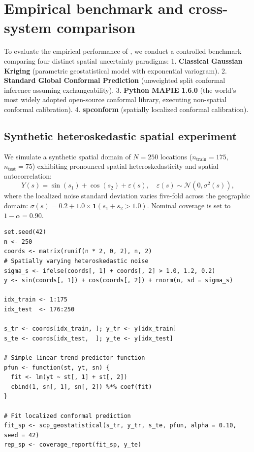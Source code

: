 \section{Empirical benchmark and cross-system comparison}\label{empirical-benchmark-and-cross-system-comparison}

To evaluate the empirical performance of , we conduct a controlled benchmark comparing four distinct spatial uncertainty paradigms:
1. \textbf{Classical Gaussian Kriging} (parametric geostatistical model with exponential variogram).
2. \textbf{Standard Global Conformal Prediction} (unweighted split conformal inference assuming exchangeability).
3. \textbf{Python MAPIE 1.6.0} (the world's most widely adopted open-source conformal library, executing non-spatial conformal calibration).
4. \textbf{spconform} (spatially localized conformal calibration).

\subsection{Synthetic heteroskedastic spatial experiment}\label{synthetic-heteroskedastic-spatial-experiment}

We simulate a synthetic spatial domain of \(N = 250\) locations (\(n_{\text{train}} = 175\), \(n_{\text{test}} = 75\)) exhibiting pronounced spatial heteroskedasticity and spatial autocorrelation:
\[
Y(s) = \sin(s_1) + \cos(s_2) + \varepsilon(s), \quad \varepsilon(s) \sim \mathcal{N}\left(0, \sigma^2(s)\right),
\]
where the localized noise standard deviation varies five-fold across the geographic domain: \(\sigma(s) = 0.2 + 1.0 \times \mathbf{1}(s_1 + s_2 > 1.0)\). Nominal coverage is set to \(1 - \alpha = 0.90\).

\begin{verbatim}
set.seed(42)
n <- 250
coords <- matrix(runif(n * 2, 0, 2), n, 2)
# Spatially varying heteroskedastic noise
sigma_s <- ifelse(coords[, 1] + coords[, 2] > 1.0, 1.2, 0.2)
y <- sin(coords[, 1]) + cos(coords[, 2]) + rnorm(n, sd = sigma_s)

idx_train <- 1:175
idx_test  <- 176:250

s_tr <- coords[idx_train, ]; y_tr <- y[idx_train]
s_te <- coords[idx_test,  ]; y_te <- y[idx_test]

# Simple linear trend predictor function
pfun <- function(st, yt, sn) {
  fit <- lm(yt ~ st[, 1] + st[, 2])
  cbind(1, sn[, 1], sn[, 2]) %*% coef(fit)
}

# Fit localized conformal prediction
fit_sp <- scp_geostatistical(s_tr, y_tr, s_te, pfun, alpha = 0.10, seed = 42)
rep_sp <- coverage_report(fit_sp, y_te)
\end{verbatim}

